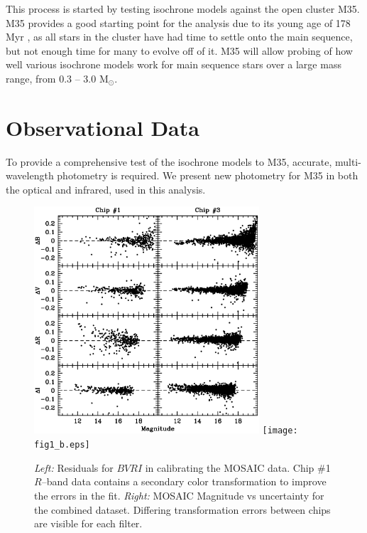 \documentclass[iop]{emulateapj}
\begin{document}
This process is started by testing isochrone models against the open cluster M35. M35 provides a good starting point for the analysis due to its young age of 178 Myr \citep{2002AA...389..871D}, as all stars in the cluster have had time to settle onto the main sequence, but not enough time for many to evolve off of it. M35 will allow probing of how well various isochrone models work for main sequence stars over a large mass range, from 0.3 -- 3.0 M$_\odot$.




\section{Observational Data} \label{sec:data}
To provide a comprehensive test of the isochrone models to M35, accurate, multi-wavelength photometry is required. We present new photometry for M35 in both the optical and infrared, used in this analysis.

\begin{figure} \centering
\includegraphics[trim = 0mm 5mm 5mm 0mm, clip, width=3.3in]{fig1_a.eps}			%
\texttt{[image: fig1\_b.eps]}		%
\caption{\emph{Left:} Residuals for $BVRI$ in calibrating the MOSAIC data. Chip \#1 $R$--band data contains a secondary color transformation to improve the errors in the fit. \emph{Right:} MOSAIC Magnitude vs uncertainty for the combined dataset. Differing transformation errors between chips are visible for each filter. \label{fig:MOSphotometry}}
\end{figure}
\end{document}
